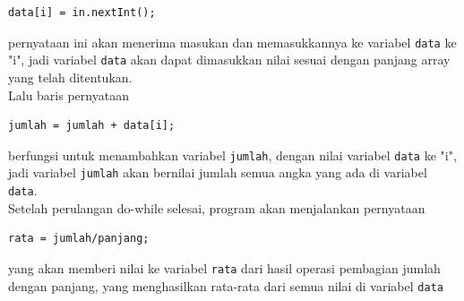 \documentclass[a4paper,12pt]{article}
\begin{document}
\begin{lstlisting}
data[i] = in.nextInt();
\end{lstlisting}
pernyataan ini akan menerima masukan dan memasukkannya ke variabel \texttt{data} ke "i", jadi variabel \texttt{data} akan dapat dimasukkan nilai sesuai dengan panjang array yang telah ditentukan.\\
Lalu baris pernyataan
\begin{lstlisting}
jumlah = jumlah + data[i];
\end{lstlisting}
berfungsi untuk menambahkan variabel \texttt{jumlah}, dengan nilai variabel \texttt{data} ke "i", jadi variabel \texttt{jumlah} akan bernilai jumlah semua angka yang ada di variabel \texttt{data}.\\
Setelah perulangan do-while selesai, program akan menjalankan pernyataan
\begin{lstlisting}
rata = jumlah/panjang;
\end{lstlisting}
yang akan memberi nilai ke variabel \texttt{rata} dari hasil operasi pembagian jumlah dengan panjang, yang menghasilkan rata-rata dari semua nilai di variabel \texttt{data}
\end{document}
